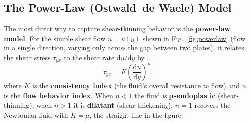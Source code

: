 \documentclass[11pt]{article}
\begin{document}
\subsection{The Power-Law (Ostwald--de Waele) Model}

The most direct way to capture shear-thinning behavior is the \textbf{power-law model}. For the simple shear flow $u=u(y)$ shown in Fig.~\ref{fig:powerlaw} (flow in a single direction, varying only across the gap between two plates), it relates the shear stress $\tau_{yx}$ to the shear rate $\mathrm{d}u/\mathrm{d}y$ by
\begin{equation}
  \tau_{yx} = K\left(\frac{\mathrm{d}u}{\mathrm{d}y}\right)^{n},
  \label{eq:powerlaw-1d}
\end{equation}
where $K$ is the \textbf{consistency index} (the fluid's overall resistance to flow) and $n$ is the \textbf{flow behavior index}. When $n<1$ the fluid is \textbf{pseudoplastic} (shear-thinning); when $n>1$ it is \textbf{dilatant} (shear-thickening); $n=1$ recovers the Newtonian fluid with $K=\mu$, the straight line in the figure.
\end{document}
